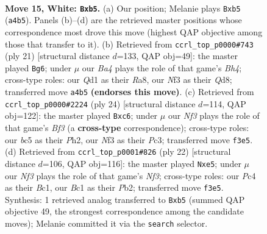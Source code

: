\documentclass[11pt]{article}
\begin{document}
\clearpage

\begin{figure}[p]\centering
\begin{subfigure}{0.46\textwidth}\centering
\resizebox{\linewidth}{!}{%
\newchessgame
\chessboard[
  setfen={r1b2rk1/2p2p2/2n2np1/ppb1p2p/B1P4P/3q1N2/PP1N1PP1/R1BQR1K1 w - - 0 15},
  showmover=false,
  pgfstyle=straightmove, color=movearrow, markmove={a4-b5}
]}
\caption{}
\end{subfigure}\hfill
\begin{subfigure}{0.46\textwidth}\centering
\resizebox{\linewidth}{!}{%
\newchessgame
\chessboard[
  setfen={r2qk2r/pp1n1ppp/2pb1n2/4p2b/2BPP1P1/P1N2N1P/1P3P2/R1BQ1RK1 b kq - 0 11},
  showmover=false,
  pgfstyle=straightmove, color=movearrow, markmove={h5-g6}
]}
\caption{}
\end{subfigure}
\\[4pt]
\begin{subfigure}{0.46\textwidth}\centering
\resizebox{\linewidth}{!}{%
\newchessgame
\chessboard[
  setfen={r1br1bk1/pp3pp1/2n2n1p/2p1p3/2N5/2Pq1B2/PP1N1PPP/R1BQR1K1 w - - 0 13},
  showmover=false,
  pgfstyle=straightmove, color=movearrow, markmove={f3-c6}
]}
\caption{}
\end{subfigure}\hfill
\begin{subfigure}{0.46\textwidth}\centering
\resizebox{\linewidth}{!}{%
\newchessgame
\chessboard[
  setfen={r4rk1/ppp1bppp/1nn5/4p2b/8/1BPq1N1P/PP1N1PP1/R1BQR1K1 w - - 0 12},
  showmover=false,
  pgfstyle=straightmove, color=movearrow, markmove={f3-e5}
]}
\caption{}
\end{subfigure}
\caption{\textbf{Move 15, White: \texttt{Bxb5}.} (a) Our position; Melanie plays \texttt{Bxb5} (\texttt{a4b5}). Panels (b)--(d) are the retrieved master positions whose correspondence most drove this move (highest QAP objective among those that transfer to it). (b) Retrieved from \texttt{ccrl\_top\_p0000\#743} (ply 21) [structural distance $d$=133, QAP obj=49]: the master played \texttt{Bg6}; under $\mu$ our \emph{Ba4} plays the role of that game's \emph{Bh4}; cross-type roles: our \emph{Q}d1 as their \emph{R}a8, our \emph{N}f3 as their \emph{Q}d8; transferred move \texttt{a4b5} \textbf{(endorses this move)}. (c) Retrieved from \texttt{ccrl\_top\_p0000\#2224} (ply 24) [structural distance $d$=114, QAP obj=122]: the master played \texttt{Bxc6}; under $\mu$ our \emph{Nf3} plays the role of that game's \emph{Bf3} (a \textbf{cross-type} correspondence); cross-type roles: our \emph{b}c5 as their \emph{P}h2, our \emph{N}f3 as their \emph{P}c3; transferred move \texttt{f3e5}. (d) Retrieved from \texttt{ccrl\_top\_p0001\#826} (ply 22) [structural distance $d$=106, QAP obj=116]: the master played \texttt{Nxe5}; under $\mu$ our \emph{Nf3} plays the role of that game's \emph{Nf3}; cross-type roles: our \emph{P}c4 as their \emph{B}c1, our \emph{B}c1 as their \emph{P}b2; transferred move \texttt{f3e5}. Synthesis: 1 retrieved analog transferred to \texttt{Bxb5} (summed QAP objective 49, the strongest correspondence among the candidate moves); Melanie committed it via the \texttt{search} selector.}
\label{fig:thought-m28}
\end{figure}
\end{document}
